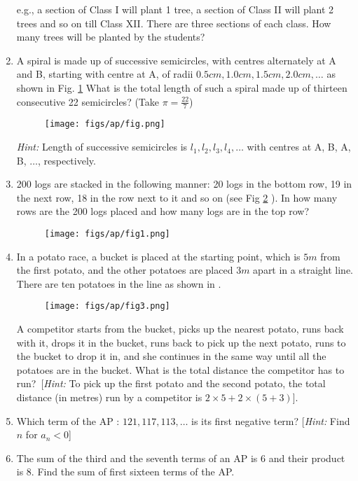\begin{enumerate}[label=\thesubsection.\arabic*, ref=\thesubsection.\theenumi]
e.g.,  a section of Class I will plant 1 tree,  
a section of Class II will plant 2 trees and so on till Class XII. There are three sections of each class. How many trees will be planted by the students?
\item A spiral is made up of successive semicircles,  with centres alternately at A and B,  starting with centre at A,  of radii $0.5 cm,  1.0 cm,  1.5 cm,  2.0 cm, \dots $  as shown in Fig.
		\ref{fig:fig}
	What is the total length of such a spiral made up of thirteen consecutive 22 semicircles? (Take $\pi =\frac{22}{7}$)
	\begin{figure}[H]
		\centering
\texttt{[image: figs/ap/fig.png]} 
		\caption{}
		\label{fig:fig}
	\end{figure}
{\em Hint:} Length of successive semicircles is $l_1,  l_2,  l_3,  l_4 ,  \dots$ with centres at A,  B,  A,  B,  $\dots $, respectively.
\item 200 logs are stacked in the following manner: 20 logs in the bottom row,  19 in the next row,  18 in the row next to it and so on (see Fig
		\ref{fig:fig1}
	). In how many rows are the 200 logs placed and how many logs are in the top row?
	\begin{figure}[H]
		\centering
\texttt{[image: figs/ap/fig1.png]}
		\caption{}
		\label{fig:fig1}
	\end{figure}
\item In a potato race,  a bucket is placed at the starting point,  which is $5m$ from the first potato,  and the other potatoes are placed $3m$ apart in a straight line. There are ten potatoes in the line
		as shown in .
	\begin{figure}[H]
		\centering
\texttt{[image: figs/ap/fig3.png]} 
		\caption{}
		\label{fig:fig3}
	\end{figure}
A competitor starts from the bucket,  picks up the nearest potato,  runs back with it,  drops it in the bucket,  runs back to pick up the next potato,  runs to the bucket to drop it in,  and she continues in the same way until all the potatoes are in the bucket. What is the total distance the competitor has to run?\
[{\em Hint:} To pick up the first potato and the second potato,  the total distance (in metres)
run by a competitor is $2 \times 5 + 2 \times (5 + 3)$].
\item Which term of the AP : $121,  117,  113, \dots $ is its first negative term? [{\em Hint:} Find $n$ for $a_n < 0$]
\item The sum of the third and the seventh terms of an AP is 6 and their product is 8. Find the sum of first sixteen terms of the AP.

\end{enumerate}
